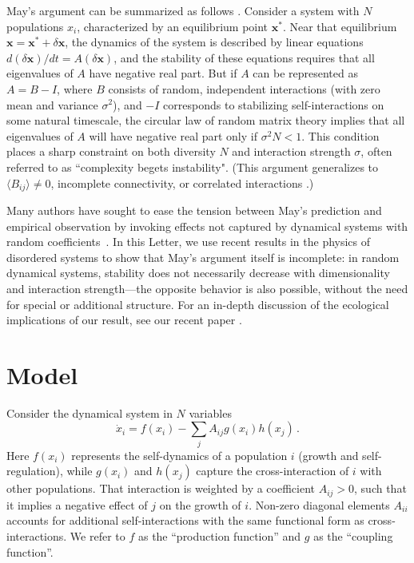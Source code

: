 \documentclass[
 pre,
 twocolumn,
 amsmath,
 amssymb,
 aps,
]{revtex4-2}
\begin{document}
May's argument can be summarized as follows \cite{May1972}.
Consider a system with $N$ populations $x_i$, characterized by an equilibrium point $\mathbf x^*$.
Near that equilibrium $\mathbf x = \mathbf x^* + \delta \mathbf x$, the dynamics of the system is described by linear equations $d(\delta \mathbf x)/dt = A (\delta \mathbf x)$, and the stability of these equations requires that all eigenvalues of $A$ have negative real part.
But if $A$ can be represented as $A = B - I$, where $B$ consists of random, independent interactions (with zero 
mean and variance $\sigma^2$), and $-I$ corresponds to stabilizing self-interactions on some natural timescale,  the circular law of random matrix theory implies that all eigenvalues of $A$ will have negative real part only if $\sigma^2 N < 1$.
This condition places a sharp constraint on both diversity $N$ and interaction strength $\sigma$, often referred to as ``complexity begets instability".
(This argument generalizes to $\langle B_{ij}\rangle \neq 0$, incomplete connectivity, or correlated interactions \cite{allesina2015stability}.)

Many authors have sought to ease the tension between May's prediction and empirical observation by invoking effects not captured by dynamical systems with random coefficients~\cite{McCann2000,Chesson2000,Mougi2012,Rohr2014,Barabas2017,Grilli2017}. 
In this Letter, we use recent results in the physics of disordered systems \cite{Ahmadian2015, Roy2019} to show that May's argument itself is incomplete: in random dynamical systems, stability does not necessarily decrease with dimensionality and interaction strength---the opposite behavior is also possible, without the need for special or additional structure.
For an in-depth discussion of the ecological implications of our result, see our recent paper \cite{Hatton2024}.

\section{Model}
Consider the dynamical system in $N$ variables
\begin{equation}\label{dynamics}
    \dot{x}_i = f(x_i) - \sum_{j}A_{ij}g(x_i)h(x_j) \, .
\end{equation}
Here $f(x_i)$ represents the self-dynamics of a population $i$ (growth and self-regulation), while $g(x_i)$ and $h(x_j)$ capture the cross-interaction of $i$ with other populations. That interaction is weighted by a coefficient $A_{ij}>0$, such that it implies a negative effect of $j$ on the growth of $i$. Non-zero diagonal elements $A_{ii}$ accounts for additional self-interactions with the same functional form as cross-interactions. 
We refer to $f$ as the ``production function'' and $g$ as the ``coupling function''.
\end{document}
